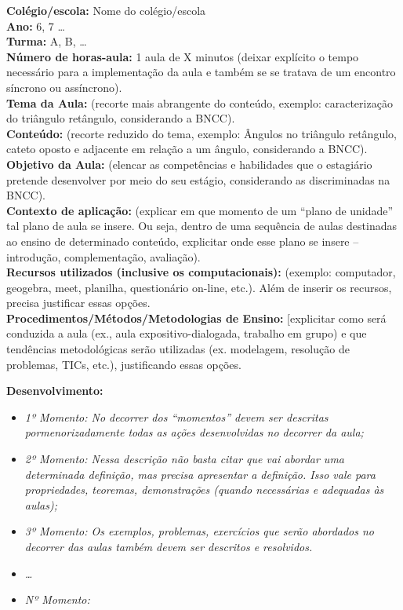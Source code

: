 \documentclass[12pt, a4paper]{article}
\begin{document}
\textbf{Colégio/escola:} Nome do colégio/escola\\[4pt]
\textbf{Ano:} 6, 7 \ldots\\[4pt]
\textbf{Turma:} A, B, \ldots\\[4pt]
\textbf{Número de horas-aula:} 1 aula de X minutos (deixar explícito o tempo necessário para a implementação da aula e também se se tratava de um encontro síncrono ou assíncrono).\\[4pt]
\textbf{Tema da Aula:} (recorte mais abrangente do conteúdo, exemplo: caracterização do triângulo retângulo, considerando a BNCC).\\[4pt]
\textbf{Conteúdo:} (recorte reduzido do tema, exemplo: Ângulos no triângulo retângulo, cateto oposto e adjacente em relação a um ângulo, considerando a BNCC).\\[4pt]
\textbf{Objetivo da Aula:} (elencar as competências e habilidades que o estagiário pretende desenvolver por meio do seu estágio, considerando as discriminadas na BNCC).\\[4pt]
\textbf{Contexto de aplicação:} (explicar em que momento de um ``plano de unidade'' tal plano de aula se insere. Ou seja, dentro de uma sequência de aulas destinadas ao ensino de determinado conteúdo, explicitar onde esse plano se insere -- introdução, complementação, avaliação).\\[4pt]
\textbf{Recursos utilizados (inclusive os computacionais):} (exemplo: computador, geogebra, meet, planilha, questionário on-line, etc.). Além de inserir os recursos, precisa justificar essas opções.\\[4pt]
\textbf{Procedimentos/Métodos/Metodologias de Ensino:} [explicitar como será conduzida a aula (ex., aula expositivo-dialogada, trabalho em grupo) e que tendências metodológicas serão utilizadas (ex. modelagem, resolução de problemas, TICs, etc.), justificando essas opções.

\vspace{0.4cm}

\textbf{Desenvolvimento:}

\begin{itemize}[leftmargin=1.5cm, label={}]
  \item \textit{1º Momento: No decorrer dos ``momentos'' devem ser descritas pormenorizadamente todas as ações desenvolvidas no decorrer da aula;}
  \item \textit{2º Momento: Nessa descrição não basta citar que vai abordar uma determinada definição, mas precisa apresentar a definição. Isso vale para propriedades, teoremas, demonstrações (quando necessárias e adequadas às aulas);}
  \item \textit{3º Momento: Os exemplos, problemas, exercícios que serão abordados no decorrer das aulas também devem ser descritos e resolvidos.}
  \item[] \textit{\ldots}
  \item \textit{Nº Momento:}
\end{itemize}
\end{document}
